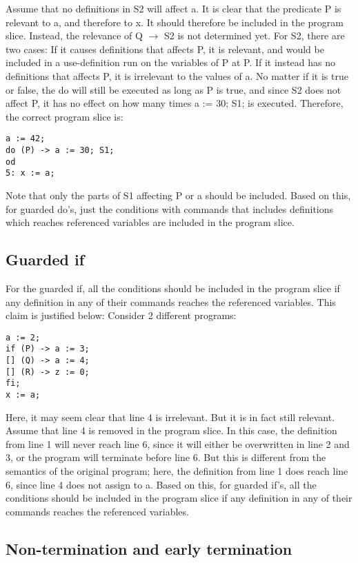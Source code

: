 Assume that no definitions in S2 will affect a.
It is clear that the predicate P is relevant to a,
and therefore to x. It should therefore be included in the program slice. Instead, the relevance of Q
$\rightarrow$ S2 is not determined yet. For S2, there are two cases: If it causes definitions that affects P, it is
relevant, and would be included in a use-definition run on the variables of P at P. If it instead has no
definitions that affects P, it is irrelevant to the values of a. No matter if it is true or false, the do will
still be executed as long as P is true, and since S2 does not affect P, it has no effect on how many times
a := 30; S1; is executed. Therefore, the correct program slice is:
\begin{lstlisting}
a := 42;
do (P) -> a := 30; S1;
od
5: x := a;
\end{lstlisting}
Note that only the parts of S1 affecting P or a should be included.
Based on this, for guarded do's, just the conditions with commands that includes definitions which
reaches referenced variables are included in the program slice.

\subsection{Guarded if}

For the guarded if, all the conditions should be included in the program slice if any definition in any
of their commands reaches the referenced variables. This claim is justified below:
Consider 2 different programs:
\begin{lstlisting}
a := 2;
if (P) -> a := 3;
[] (Q) -> a := 4;
[] (R) -> z := 0;
fi;
x := a;
\end{lstlisting}
Here, it may seem clear that line 4 is irrelevant. But it is in fact still relevant. Assume that line 4 is
removed in the program slice. In this case, the definition from line 1 will never reach line 6, since it
will either be overwritten in line 2 and 3, or the program will terminate before line 6. But this is
different from the semantics of the original program; here, the definition from line 1 does reach line
6, since line 4 does not assign to a.
Based on this, for guarded if's, all the conditions should be included in the program slice if any
definition in any of their commands reaches the referenced variables.

\subsection{Non-termination and early termination}

